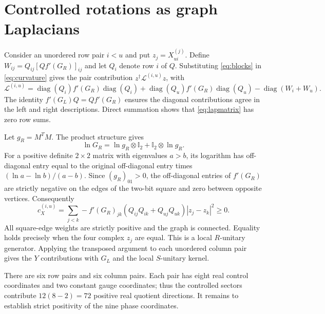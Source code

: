 \documentclass[11pt]{article}
\newcommand{\diag}{\operatorname{diag}}
\newcommand{\id}{\mathbb I}
\begin{document}
\section{Controlled rotations as graph Laplacians}
Consider an unordered row pair $i<u$ and put $z_j=X^{(j)}_{ui}$. Define $W_{ij}=Q_{ij}[Qf'(G_R)]_{ij}$ and let $Q_i$ denote row $i$ of $Q$. Substituting \eqref{eq:blocks} in \eqref{eq:curvature} gives the pair contribution $z^\dagger\mathcal L^{(i,u)}z$, with
\begin{equation}\label{eq:lapmatrix}
 \mathcal L^{(i,u)}=
 \diag(Q_i)f'(G_R)\diag(Q_i)+
 \diag(Q_u)f'(G_R)\diag(Q_u)-\diag(W_i+W_u).
\end{equation}
The identity $f'(G_L)Q=Qf'(G_R)$ ensures the diagonal contributions agree in the left and right descriptions. Direct summation shows that \eqref{eq:lapmatrix} has zero row sums.

Let $g_R=M^TM$. The product structure gives
\begin{equation}\label{eq:logproduct}
 \ln G_R=\ln g_R\otimes\id_2+\id_2\otimes\ln g_R.
\end{equation}
For a positive definite $2\times2$ matrix with eigenvalues $a>b$, its logarithm has off-diagonal entry equal to the original off-diagonal entry times $(\ln a-\ln b)/(a-b)$. Since $(g_R)_{01}>0$, the off-diagonal entries of $f'(G_R)$ are strictly negative on the edges of the two-bit square and zero between opposite vertices. Consequently
\begin{equation}\label{eq:lapform}
 c_X^{(i,u)}=
 \sum_{j<k}-f'(G_R)_{jk}
       (Q_{ij}Q_{ik}+Q_{uj}Q_{uk})|z_j-z_k|^2\ge0.
\end{equation}
All square-edge weights are strictly positive and the graph is connected. Equality holds precisely when the four complex $z_j$ are equal. This is a local $R$-unitary generator. Applying the transposed argument to each unordered column pair gives the $Y$ contributions with $G_L$ and the local $S$-unitary kernel.

There are six row pairs and six column pairs. Each pair has eight real control coordinates and two constant gauge coordinates; thus the controlled sectors contribute $12(8-2)=72$ positive real quotient directions. It remains to establish strict positivity of the nine phase coordinates.
\end{document}
